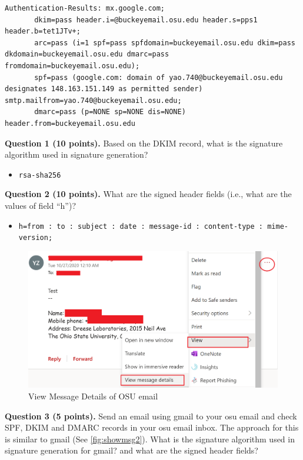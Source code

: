 \documentclass[11pt]{article}
\newcommand{\dmark}{{\sf DMARC}\xspace}
\newcommand{\dkim}{{\sf DKIM}\xspace}
\newcommand{\spf}{{\sf SPF}\xspace}
\begin{document}
\begin{enumerate}
\begin{lstlisting}
Authentication-Results: mx.google.com;
       dkim=pass header.i=@buckeyemail.osu.edu header.s=pps1 header.b=tet1JTv+;
       arc=pass (i=1 spf=pass spfdomain=buckeyemail.osu.edu dkim=pass dkdomain=buckeyemail.osu.edu dmarc=pass fromdomain=buckeyemail.osu.edu);
       spf=pass (google.com: domain of yao.740@buckeyemail.osu.edu designates 148.163.151.149 as permitted sender) smtp.mailfrom=yao.740@buckeyemail.osu.edu;
       dmarc=pass (p=NONE sp=NONE dis=NONE) header.from=buckeyemail.osu.edu
\end{lstlisting}\vspace{-6mm}

\textbf{Question 1 (10 points).} Based on the \dkim record, what is the signature algorithm used in signature generation?

\begin{itemize}
  \item \texttt{rsa-sha256}
\end{itemize}

\textbf{Question 2 (10 points).} What are the signed header fields (i.e., what are the values of field ``h'')?

\begin{itemize}
  \item \texttt{h=from : to : subject : date : message-id : content-type : mime-version;}
\end{itemize}

\begin{figure} [h]
\centering
\vspace{-2mm}
\includegraphics[width=0.7\columnwidth]{dkim2}
\caption{View Message Details of OSU email}\label{fig:showmsg2}
\end{figure}

\textbf{Question 3 (5 points).} Send an email using gmail to your osu email and check \spf, \dkim and \dmark records in your osu email inbox. The approach for this is similar to gmail (See \autoref{fig:showmsg2}). What is the signature algorithm used in signature generation for gmail? and what are the signed header fields?


\end{enumerate}
\end{document}
